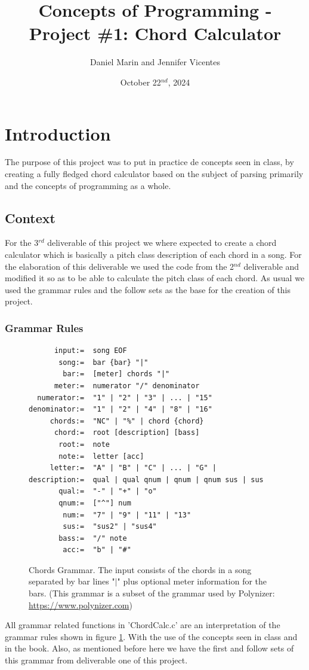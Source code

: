 \documentclass{article}
\title{Concepts of Programming - Project \#1: Chord Calculator}
\author{Daniel Marin and Jennifer Vicentes}
\date{October 22$^{nd}$, 2024}
\begin{document}
\maketitle
\tableofcontents
\newpage
\section{Introduction}
The purpose of this project was to put in practice de concepts seen in class, by creating a fully fledged chord calculator based on the subject of parsing primarily and the concepts of programming as a whole.
\subsection{Context}
For the 3$^{rd}$ deliverable of this project we where expected to create a chord calculator which is basically a pitch class description of each chord in a song. For the elaboration of this deliverable we used the code from the 2$^{nd}$ deliverable and modified it so as to be able to calculate the pitch class of each chord. As usual we used the grammar rules and the follow sets as the base for the creation of this project. 
\subsubsection{Grammar Rules}
\begin{figure}[H]
    \centering
    \begin{lstlisting}
      input:=  song EOF
       song:=  bar {bar} "|"
        bar:=  [meter] chords "|"
      meter:=  numerator "/" denominator
  numerator:=  "1" | "2" | "3" | ... | "15"
denominator:=  "1" | "2" | "4" | "8" | "16"
     chords:=  "NC" | "%" | chord {chord}
      chord:=  root [description] [bass]
       root:=  note
       note:=  letter [acc]
     letter:=  "A" | "B" | "C" | ... | "G" |
description:=  qual | qual qnum | qnum | qnum sus | sus
       qual:=  "-" | "+" | "o"
       qnum:=  ["^"] num
        num:=  "7" | "9" | "11" | "13"
        sus:=  "sus2" | "sus4"
       bass:=  "/" note
        acc:=  "b" | "#"
    \end{lstlisting}
    \caption{Chords Grammar. The input consists of the chords in a song separated by bar lines "$|$" plus optional meter information for the bars. (This grammar is a subset of the grammar used by Polynizer: \url{https://www.polynizer.com})}
    \label{fig:Grammar}
\end{figure} 
All grammar related functions in 'ChordCalc.c' are an interpretation of the grammar rules shown in figure \ref*{fig:Grammar}. With the use of the concepts seen in class and in the book. Also, as mentioned before here we have the first and follow sets of this grammar from deliverable one of this project.
\end{document}
